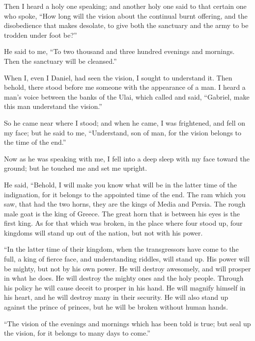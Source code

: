  Then I heard a holy one speaking; and another holy one
said to that certain one who spoke, ``How long will the vision about the
continual burnt offering, and the disobedience that makes desolate, to
give both the sanctuary and the army to be trodden under foot be?''

 He said to me, ``To two thousand and three hundred
evenings and mornings. Then the sanctuary will be cleansed.''

 When I, even I Daniel, had seen the vision, I sought to
understand it. Then behold, there stood before me someone with the
appearance of a man.  I heard a man's voice between the
banks of the Ulai, which called and said, ``Gabriel, make this man
understand the vision.''

 So he came near where I stood; and when he came, I was
frightened, and fell on my face; but he said to me, ``Understand, son of
man, for the vision belongs to the time of the end.''

 Now as he was speaking with me, I fell into a deep sleep
with my face toward the ground; but he touched me and set me upright.

 He said, ``Behold, I will make you know what will be in
the latter time of the indignation, for it belongs to the appointed time
of the end.  The ram which you saw, that had the two
horns, they are the kings of Media and Persia.  The rough
male goat is the king of Greece. The great horn that is between his eyes
is the first king.  As for that which was broken, in the
place where four stood up, four kingdoms will stand up out of the
nation, but not with his power.

 ``In the latter time of their kingdom, when the
transgressors have come to the full, a king of fierce face, and
understanding riddles, will stand up.  His power will be
mighty, but not by his own power. He will destroy awesomely, and will
prosper in what he does. He will destroy the mighty ones and the holy
people.  Through his policy he will cause deceit to
prosper in his hand. He will magnify himself in his heart, and he will
destroy many in their security. He will also stand up against the prince
of princes, but he will be broken without human hands.

 ``The vision of the evenings and mornings which has been
told is true; but seal up the vision, for it belongs to many days to
come.''


